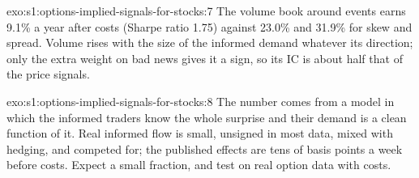 \begin{solution}{exo:s1:options-implied-signals-for-stocks:7}
The volume book around events earns 9.1\% a year after costs (Sharpe ratio 1.75) against 23.0\% and 31.9\% for skew and spread. Volume rises with the size of
the informed demand whatever its direction; only the extra weight on bad news gives it a sign, so its IC is about half that of the price signals.
\end{solution}

\begin{solution}{exo:s1:options-implied-signals-for-stocks:8}
The number comes from a model in which the informed traders know the whole surprise and their demand is a clean function of it. Real informed flow is small,
unsigned in most data, mixed with hedging, and competed for; the published effects are tens of basis points a week before costs. Expect a small fraction,
and test on real option data with costs.
\end{solution}

